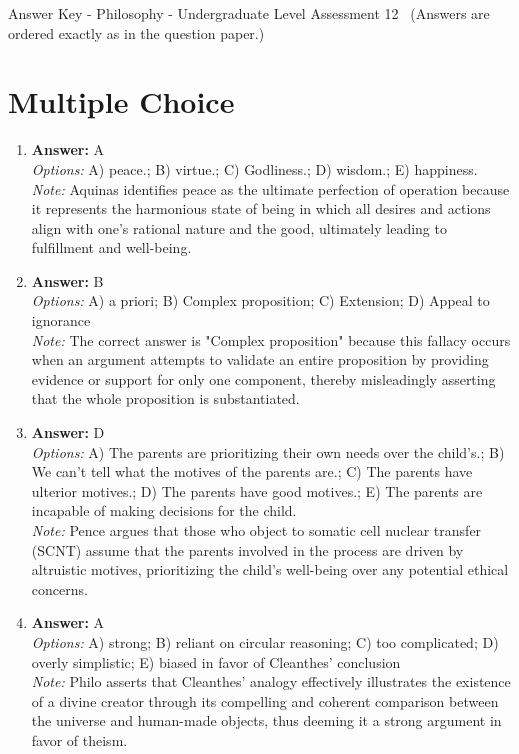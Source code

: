\documentclass[12pt]{article}
\begin{document}
\begin{center}
Answer Key - Philosophy - Undergraduate Level Assessment 12 \
\small (Answers are ordered exactly as in the question paper.)
\end{center}

\section*{Multiple Choice}
\begin{enumerate}[label=\arabic*.]
\item \textbf{Answer:} A
\\ \textit{Options:} A) peace.; B) virtue.; C) Godliness.; D) wisdom.; E) happiness.
\\ \textit{Note:} Aquinas identifies peace as the ultimate perfection of operation because it represents the harmonious state of being in which all desires and actions align with one's rational nature and the good, ultimately leading to fulfillment and well-being.
\item \textbf{Answer:} B
\\ \textit{Options:} A) a priori; B) Complex proposition; C) Extension; D) Appeal to ignorance
\\ \textit{Note:} The correct answer is "Complex proposition" because this fallacy occurs when an argument attempts to validate an entire proposition by providing evidence or support for only one component, thereby misleadingly asserting that the whole proposition is substantiated.
\item \textbf{Answer:} D
\\ \textit{Options:} A) The parents are prioritizing their own needs over the child's.; B) We can't tell what the motives of the parents are.; C) The parents have ulterior motives.; D) The parents have good motives.; E) The parents are incapable of making decisions for the child.
\\ \textit{Note:} Pence argues that those who object to somatic cell nuclear transfer (SCNT) assume that the parents involved in the process are driven by altruistic motives, prioritizing the child's well-being over any potential ethical concerns.
\item \textbf{Answer:} A
\\ \textit{Options:} A) strong; B) reliant on circular reasoning; C) too complicated; D) overly simplistic; E) biased in favor of Cleanthes' conclusion
\\ \textit{Note:} Philo asserts that Cleanthes' analogy effectively illustrates the existence of a divine creator through its compelling and coherent comparison between the universe and human-made objects, thus deeming it a strong argument in favor of theism.

\end{enumerate}
\end{document}
